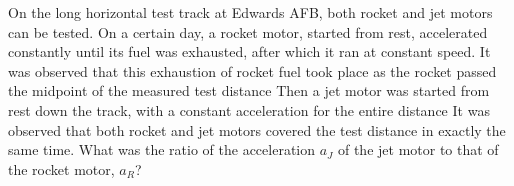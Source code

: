 \documentclass[../feynman-lectures-on-physics.tex]{subfiles}
\begin{document}
\begin{questions}

	\question On the long horizontal test track at Edwards AFB, both rocket and jet motors can be tested. On a certain day, a rocket motor, started from rest, accelerated constantly until its fuel was exhausted, after which it ran at constant speed. It was observed that this exhaustion of rocket fuel took place as the rocket passed the midpoint of the measured test distance Then a jet motor was started from rest down the track, with a constant acceleration for the entire distance It was observed that both rocket and jet motors covered the test distance in exactly the same time. What was the ratio of the acceleration $a_J$ of the jet motor to that of the rocket motor, $a_R$?
\end{questions}
\end{document}
